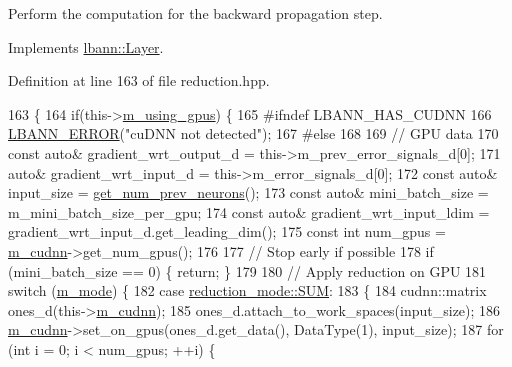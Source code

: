 Perform the computation for the backward propagation step. 

Implements \hyperlink{classlbann_1_1Layer_a7442e01f9ee1294df2de811efcf5171e}{lbann\+::\+Layer}.



Definition at line 163 of file reduction.\+hpp.


\begin{DoxyCode}
163                              \{
164     \textcolor{keywordflow}{if}(this->\hyperlink{classlbann_1_1Layer_af7881cb5eff5207c15fa835d65462e8f}{m\_using\_gpus}) \{
165 \textcolor{preprocessor}{    #ifndef LBANN\_HAS\_CUDNN}
166       \hyperlink{base_8hpp_a80b1d707117e968a6951b7222e4b2b87}{LBANN\_ERROR}(\textcolor{stringliteral}{"cuDNN not detected"});
167 \textcolor{preprocessor}{    #else}
168 
169       \textcolor{comment}{// GPU data}
170       \textcolor{keyword}{const} \textcolor{keyword}{auto}& gradient\_wrt\_output\_d = this->m\_prev\_error\_signals\_d[0];
171       \textcolor{keyword}{auto}& gradient\_wrt\_input\_d = this->m\_error\_signals\_d[0];
172       \textcolor{keyword}{const} \textcolor{keyword}{auto}& input\_size = \hyperlink{classlbann_1_1Layer_a27112eb70bbfbd7f3c3e749960400dec}{get\_num\_prev\_neurons}();
173       \textcolor{keyword}{const} \textcolor{keyword}{auto}& mini\_batch\_size = m\_mini\_batch\_size\_per\_gpu;
174       \textcolor{keyword}{const} \textcolor{keyword}{auto}& gradient\_wrt\_input\_ldim = gradient\_wrt\_input\_d.get\_leading\_dim();
175       \textcolor{keyword}{const} \textcolor{keywordtype}{int} num\_gpus = \hyperlink{classlbann_1_1Layer_a08dbb94239e3b8c96329786c57c72e21}{m\_cudnn}->get\_num\_gpus();
176 
177       \textcolor{comment}{// Stop early if possible}
178       \textcolor{keywordflow}{if} (mini\_batch\_size == 0) \{ \textcolor{keywordflow}{return}; \}
179 
180       \textcolor{comment}{// Apply reduction on GPU}
181       \textcolor{keywordflow}{switch} (\hyperlink{classlbann_1_1reduction__layer_aa8c753154fec05a00ede9217df3ba638}{m\_mode}) \{
182       \textcolor{keywordflow}{case} \hyperlink{namespacelbann_a5975e1fb530a267728bfb01dc5c1be9ba6970bdc2201030b9c03fbdcf3973858a}{reduction\_mode::SUM}:
183         \{
184           cudnn::matrix ones\_d(this->\hyperlink{classlbann_1_1Layer_a08dbb94239e3b8c96329786c57c72e21}{m\_cudnn});
185           ones\_d.attach\_to\_work\_spaces(input\_size);
186           \hyperlink{classlbann_1_1Layer_a08dbb94239e3b8c96329786c57c72e21}{m\_cudnn}->set\_on\_gpus(ones\_d.get\_data(), DataType(1), input\_size);
187           \textcolor{keywordflow}{for} (\textcolor{keywordtype}{int} i = 0; i < num\_gpus; ++i) \{

\end{DoxyCode}
